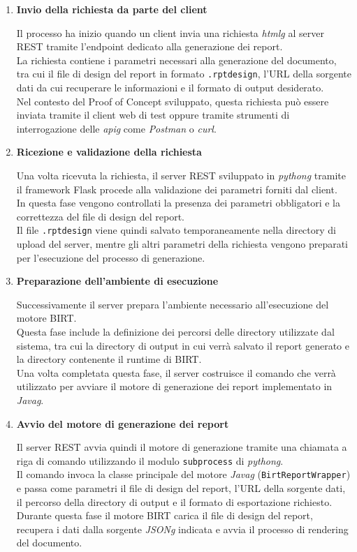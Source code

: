 \begin{enumerate}
\item \textbf{Invio della richiesta da parte del client}

Il processo ha inizio quando un client invia una richiesta \emph{\gls{htmlg}} al server REST tramite l'endpoint dedicato alla generazione dei report. \\
La richiesta contiene i parametri necessari alla generazione del documento, tra cui il file di design del report in formato \texttt{.rptdesign}, l'URL della sorgente dati da cui recuperare le informazioni e il formato di output desiderato.\\
Nel contesto del Proof of Concept sviluppato, questa richiesta può essere inviata tramite il client web di test oppure tramite strumenti di interrogazione delle \emph{\gls{apig}} come \textit{Postman} o \textit{curl}.

\item \textbf{Ricezione e validazione della richiesta}

Una volta ricevuta la richiesta, il server REST sviluppato in \emph{\gls{pythong}} tramite il framework Flask procede alla validazione dei parametri forniti dal client. \\
In questa fase vengono controllati la presenza dei parametri obbligatori e la correttezza del file di design del report.\\
Il file \texttt{.rptdesign} viene quindi salvato temporaneamente nella directory di upload del server, mentre gli altri parametri della richiesta vengono preparati per l'esecuzione del processo di generazione.

\item \textbf{Preparazione dell'ambiente di esecuzione}

Successivamente il server prepara l'ambiente necessario all'esecuzione del motore BIRT. \\
Questa fase include la definizione dei percorsi delle directory utilizzate dal sistema, tra cui la directory di output in cui verrà salvato il report generato e la directory contenente il runtime di BIRT.\\
Una volta completata questa fase, il server costruisce il comando che verrà utilizzato per avviare il motore di generazione dei report implementato in \emph{\gls{Javag}}.

\item \textbf{Avvio del motore di generazione dei report}

Il server REST avvia quindi il motore di generazione tramite una chiamata a riga di comando utilizzando il modulo \texttt{subprocess} di \emph{\gls{pythong}}. \\
Il comando invoca la classe principale del motore \emph{\gls{Javag}} (\texttt{BirtReportWrapper}) e passa come parametri il file di design del report, l'URL della sorgente dati, il percorso della directory di output e il formato di esportazione richiesto.\\
Durante questa fase il motore BIRT carica il file di design del report, recupera i dati dalla sorgente \emph{\gls{JSONg}} indicata e avvia il processo di rendering del documento.


\end{enumerate}
